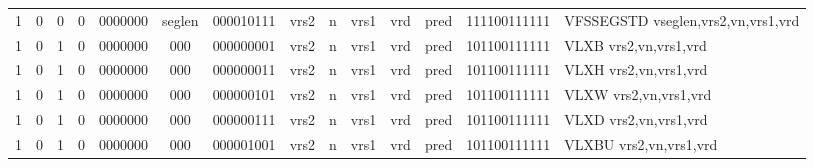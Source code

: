 \begin{landscape}
\begin{table}[p]
\begin{small}
\begin{center}
\begin{tabular}{p{0.08in}@{}p{0.08in}@{}p{0.08in}@{}p{0.08in}@{}p{0.50in}@{}p{0.30in}@{}p{0.08in}@{}p{0.8in}@{}p{0.48in}@{}p{0.32in}@{}p{0.08in}@{}p{0.8in}@{}p{0.8in}@{}p{0.4in}@{}p{0.56in}l}
\multicolumn{1}{|c|}{1} &
\multicolumn{1}{c|}{0} &
\multicolumn{1}{c|}{0} &
\multicolumn{1}{c|}{0} &
\multicolumn{1}{c|}{0000000} &
\multicolumn{1}{c|}{seglen} &
\multicolumn{2}{c|}{000010111} &
\multicolumn{2}{c|}{vrs2} &
\multicolumn{1}{c|}{n} &
\multicolumn{1}{c|}{vrs1} &
\multicolumn{1}{c|}{vrd} &
\multicolumn{1}{c|}{pred} &
\multicolumn{1}{c|}{111100111111} & VFSSEGSTD vseglen,vrs2,vn,vrs1,vrd \\
\cline{1-15}
  

\multicolumn{1}{|c|}{1} &
\multicolumn{1}{c|}{0} &
\multicolumn{1}{c|}{1} &
\multicolumn{1}{c|}{0} &
\multicolumn{1}{c|}{0000000} &
\multicolumn{1}{c|}{000} &
\multicolumn{2}{c|}{000000001} &
\multicolumn{2}{c|}{vrs2} &
\multicolumn{1}{c|}{n} &
\multicolumn{1}{c|}{vrs1} &
\multicolumn{1}{c|}{vrd} &
\multicolumn{1}{c|}{pred} &
\multicolumn{1}{c|}{101100111111} & VLXB vrs2,vn,vrs1,vrd \\
\cline{1-15}
  

\multicolumn{1}{|c|}{1} &
\multicolumn{1}{c|}{0} &
\multicolumn{1}{c|}{1} &
\multicolumn{1}{c|}{0} &
\multicolumn{1}{c|}{0000000} &
\multicolumn{1}{c|}{000} &
\multicolumn{2}{c|}{000000011} &
\multicolumn{2}{c|}{vrs2} &
\multicolumn{1}{c|}{n} &
\multicolumn{1}{c|}{vrs1} &
\multicolumn{1}{c|}{vrd} &
\multicolumn{1}{c|}{pred} &
\multicolumn{1}{c|}{101100111111} & VLXH vrs2,vn,vrs1,vrd \\
\cline{1-15}
  

\multicolumn{1}{|c|}{1} &
\multicolumn{1}{c|}{0} &
\multicolumn{1}{c|}{1} &
\multicolumn{1}{c|}{0} &
\multicolumn{1}{c|}{0000000} &
\multicolumn{1}{c|}{000} &
\multicolumn{2}{c|}{000000101} &
\multicolumn{2}{c|}{vrs2} &
\multicolumn{1}{c|}{n} &
\multicolumn{1}{c|}{vrs1} &
\multicolumn{1}{c|}{vrd} &
\multicolumn{1}{c|}{pred} &
\multicolumn{1}{c|}{101100111111} & VLXW vrs2,vn,vrs1,vrd \\
\cline{1-15}
  

\multicolumn{1}{|c|}{1} &
\multicolumn{1}{c|}{0} &
\multicolumn{1}{c|}{1} &
\multicolumn{1}{c|}{0} &
\multicolumn{1}{c|}{0000000} &
\multicolumn{1}{c|}{000} &
\multicolumn{2}{c|}{000000111} &
\multicolumn{2}{c|}{vrs2} &
\multicolumn{1}{c|}{n} &
\multicolumn{1}{c|}{vrs1} &
\multicolumn{1}{c|}{vrd} &
\multicolumn{1}{c|}{pred} &
\multicolumn{1}{c|}{101100111111} & VLXD vrs2,vn,vrs1,vrd \\
\cline{1-15}
  

\multicolumn{1}{|c|}{1} &
\multicolumn{1}{c|}{0} &
\multicolumn{1}{c|}{1} &
\multicolumn{1}{c|}{0} &
\multicolumn{1}{c|}{0000000} &
\multicolumn{1}{c|}{000} &
\multicolumn{2}{c|}{000001001} &
\multicolumn{2}{c|}{vrs2} &
\multicolumn{1}{c|}{n} &
\multicolumn{1}{c|}{vrs1} &
\multicolumn{1}{c|}{vrd} &
\multicolumn{1}{c|}{pred} &
\multicolumn{1}{c|}{101100111111} & VLXBU vrs2,vn,vrs1,vrd \\
\cline{1-15}
  


\end{tabular}
\end{center}
\end{small}
\end{table}
\end{landscape}
